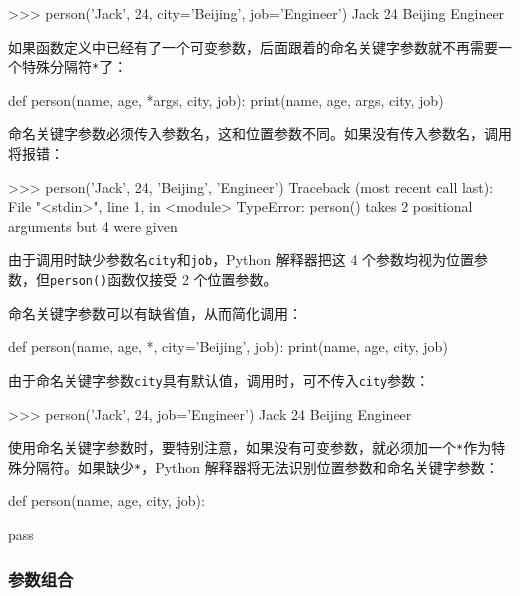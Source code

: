\begin{pythoncode}
>>> person('Jack', 24, city='Beijing', job='Engineer')
Jack 24 Beijing Engineer
\end{pythoncode}

如果函数定义中已经有了一个可变参数，后面跟着的命名关键字参数就不再需要一个特殊分隔符\texttt{*}了：

\begin{pythoncode}
def person(name, age, *args, city, job):
    print(name, age, args, city, job)
\end{pythoncode}

命名关键字参数必须传入参数名，这和位置参数不同。如果没有传入参数名，调用将报错：

\begin{pythoncode}
>>> person('Jack', 24, 'Beijing', 'Engineer')
Traceback (most recent call last):
  File "<stdin>", line 1, in <module>
TypeError: person() takes 2 positional arguments but 4 were given
\end{pythoncode}

由于调用时缺少参数名\texttt{city}和\texttt{job}，Python 解释器把这 4
个参数均视为位置参数，但\texttt{person()}函数仅接受 2 个位置参数。

命名关键字参数可以有缺省值，从而简化调用：

\begin{pythoncode}
def person(name, age, *, city='Beijing', job):
    print(name, age, city, job)
\end{pythoncode}

由于命名关键字参数\texttt{city}具有默认值，调用时，可不传入\texttt{city}参数：

\begin{pythoncode}
>>> person('Jack', 24, job='Engineer')
Jack 24 Beijing Engineer
\end{pythoncode}

使用命名关键字参数时，要特别注意，如果没有可变参数，就必须加一个\texttt{*}作为特殊分隔符。如果缺少\texttt{*}，Python
解释器将无法识别位置参数和命名关键字参数：

\begin{pythoncode}
def person(name, age, city, job):
    
    pass
\end{pythoncode}

\hypertarget{ux53c2ux6570ux7ec4ux5408}{%
\subsubsection{参数组合}\label{ux53c2ux6570ux7ec4ux5408}}


